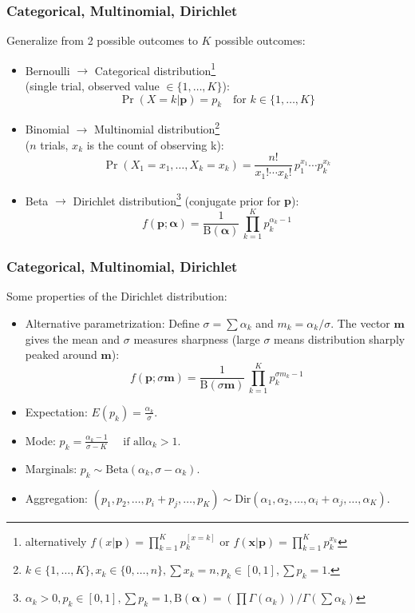 \documentclass[ignorenonframetext]{beamer}
\begin{document}
\begin{frame}\frametitle{Categorical, Multinomial, Dirichlet}
Generalize from 2 possible outcomes to $K$ possible outcomes:
\begin{itemize}
\item Bernoulli $\rightarrow$ Categorical distribution\footnote{
  alternatively $f(x|\mathbf{p})=\prod_{k=1}^K p_k^{[x=k]}$ or
  $f(\mathbf{x}|\mathbf{p})=\prod_{k=1}^K p_k^{x_k}$} 
\\(single trial, observed value $\in \{1,\dots, K\}$): \[ 
\Pr(X=k| \mathbf{p} ) = p_k\!\quad \text{for }k\in\{1,\ldots,K\}
\]

\item Binomial $\rightarrow$ Multinomial distribution\footnote{
$k\in\{1,\dots,K\}, x_k\in\{0,\dots,n\}, \sum x_k=n, p_k\in[0,1], \sum
  p_k = 1$.
}
\\($n$ trials, $x_k$ is the count of observing k):\[
\Pr(X_1 = x_1, \dots, X_k = x_k) = 
\frac{n!}{x_1!\cdots x_k!}\,p_1^{x_1}\cdots p_k^{x_k}
\]

\item Beta $\rightarrow$ Dirichlet distribution\footnote{$
\alpha_k>0, p_k\in[0,1], \sum p_k=1, 
\mbox{B}(\boldsymbol{\alpha}) = 
\left(\prod \Gamma(\alpha_k)\right)/\Gamma\left(\sum \alpha_k\right)
$}
(conjugate prior for $\mathbf{p}$):\[
f(\mathbf{p};\boldsymbol{\alpha}) = \frac{1}{\mbox{B}(\boldsymbol{\alpha})}\,
\prod_{k=1}^K p_k^{\alpha_k-1}
\]
\end{itemize}
\end{frame}

\begin{frame}\frametitle{Categorical, Multinomial, Dirichlet}
Some properties of the Dirichlet distribution:
\begin{itemize}

\item Alternative parametrization: Define $\sigma = \sum \alpha_k$ and
  $m_k = \alpha_k / \sigma$.  The vector $\mathbf{m}$ gives the mean
  and $\sigma$ measures sharpness (large $\sigma$ means distribution
  sharply peaked around $\mathbf{m}$): \[ f(\mathbf{p};\sigma
  \mathbf{m}) = \frac{1}{\mbox{B}(\sigma \mathbf{m})}\, \prod_{k=1}^K
  p_k^{\sigma m_k-1}
\]

\item Expectation: $E(p_k) = \frac{\alpha_k}{\sigma}$.

\item Mode: $p_k = \frac{\alpha_k - 1}{\sigma - K}\quad \mbox{ if all
} \alpha_k > 1$.

\item Marginals: $p_k \sim \mbox{Beta}(\alpha_k, \sigma - \alpha_k)$.

\item Aggregation: $(p_1,p_2,\ldots,p_i+p_j,\ldots,p_K) \sim 
\mbox{Dir}(\alpha_1,\alpha_2,\ldots,\alpha_i+\alpha_j,\ldots,\alpha_K)$.

\end{itemize}
\end{frame}
\end{document}
